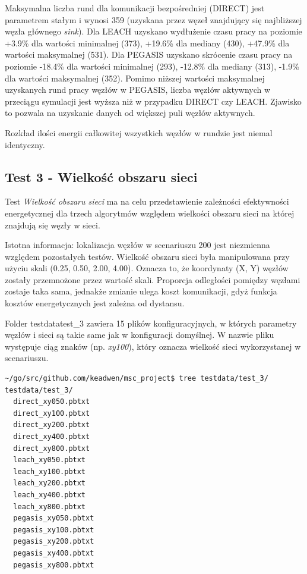 \documentclass[a4paper,12pt,twoside,openany]{report}
\begin{document}
\par
Maksymalna liczba rund dla komunikacji bezpośredniej (DIRECT) jest parametrem stałym i wynosi 359 (uzyskana przez węzeł znajdujący się najbliższej węzła głównego \textit{sink}).
Dla LEACH uzyskano wydłużenie czasu pracy na poziomie +3.9\% dla wartości minimalnej (373), +19.6\% dla mediany (430), +47.9\% dla wartości maksymalnej (531).
Dla PEGASIS uzyskano skrócenie czasu pracy na poziomie -18.4\% dla wartości minimalnej (293), -12.8\% dla mediany (313), -1.9\% dla wartości maksymalnej (352).
Pomimo niższej wartości maksymalnej uzyskanych rund pracy węzłów w PEGASIS, liczba węzłów aktywnych w przeciągu symulacji jest wyższa niż w przypadku DIRECT czy LEACH.
Zjawisko to pozwala na uzyskanie danych od większej puli węzłów aktywnych.
\par
Rozkład ilości energii całkowitej wszystkich węzłów w rundzie jest niemal identyczny.

\newpage
\subsection{Test 3 - Wielkość obszaru sieci}

Test \textit{Wielkość obszaru sieci} ma na celu przedstawienie zależności efektywności energetycznej dla trzech algorytmów względem wielkości obszaru sieci na której
znajdują się węzły w sieci.

Istotna informacja: lokalizacja węzłów w scenariuszu 200 jest niezmienna względem pozostałych testów. Wielkość obszaru sieci była manipulowana przy użyciu skali (0.25, 0.50, 2.00, 4.00).
Oznacza to, że koordynaty (X, Y) węzłów zostały przemnożone przez wartość skali. Proporcja odległości pomiędzy węzłami zostaje taka sama, jednakże zmianie ulega koszt komunikacji, gdyż 
funkcja kosztów energetycznych jest zależna od dystansu.

Folder testdata\/test\_3 zawiera 15 plików konfiguracyjnych, w których parametry węzłów i sieci są takie same jak w konfiguracji domyślnej.
W nazwie pliku występuje ciąg znaków (np. \textit{xy100}), który oznacza wielkość sieci wykorzystanej w scenariuszu.

\begin{lstlisting}
~/go/src/github.com/keadwen/msc_project$ tree testdata/test_3/
testdata/test_3/
  direct_xy050.pbtxt
  direct_xy100.pbtxt
  direct_xy200.pbtxt
  direct_xy400.pbtxt
  direct_xy800.pbtxt
  leach_xy050.pbtxt
  leach_xy100.pbtxt
  leach_xy200.pbtxt
  leach_xy400.pbtxt
  leach_xy800.pbtxt
  pegasis_xy050.pbtxt
  pegasis_xy100.pbtxt
  pegasis_xy200.pbtxt
  pegasis_xy400.pbtxt
  pegasis_xy800.pbtxt
\end{lstlisting}
\end{document}
